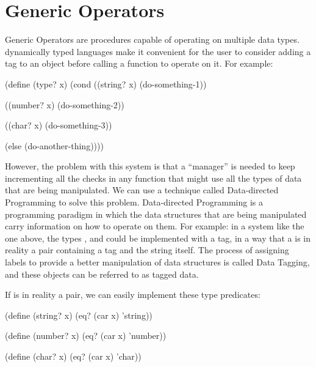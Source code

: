 
\chapter*{Generic Operators}


Generic Operators are procedures capable of operating on multiple data types. dynamically typed languages make it convenient for the user to consider adding a tag to an object before calling a function to operate on it. For example:

\begin{code}
(define (type? x)
  (cond ((string? x)
         (do-something-1))

        ((number? x)
         (do-something-2))

        ((char? x)
         (do-something-3))

        (else
         (do-another-thing))))
\end{code}


However, the problem with this system is that a ``manager'' is needed to keep incrementing all the checks in any function that might use all the types of data that are being manipulated. We can use a technique called Data-directed Programming to solve this problem. Data-directed Programming is a programming paradigm in which the data structures that are being manipulated carry information on how to operate on them. For example: in a system like the one above, the types ,  and  could be implemented with a tag, in a way that a  is in reality a pair containing a tag and the string itself. The process of assigning labels to provide a better manipulation of data structures is called Data Tagging, and these objects can be referred to as tagged data.

If  is in reality a pair, we can easily implement these type predicates:

\begin{code}
(define (string? x)
  (eq? (car x) 'string))

(define (number? x)
  (eq? (car x) 'number))

(define (char? x)
  (eq? (car x) 'char))
\end{code}

